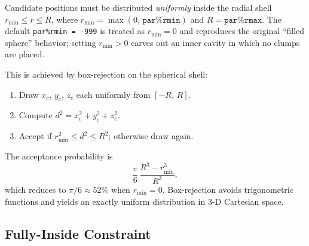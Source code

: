 \documentclass[english,a4paper]{my_memo}
\begin{document}
Candidate positions must be distributed \emph{uniformly} inside the radial
shell $r_\mathrm{min} \le r \le R$, where $r_\mathrm{min} = \max(0,\,
\texttt{par\%rmin})$ and $R = \texttt{par\%rmax}$.  The default
\verb|par%rmin = -999| is treated as $r_\mathrm{min} = 0$ and reproduces
the original ``filled sphere'' behavior; setting $r_\mathrm{min} > 0$
carves out an inner cavity in which no clumps are placed.

This is achieved by box-rejection on the spherical shell:
\begin{enumerate}
  \item Draw $x_c$, $y_c$, $z_c$ each uniformly from $[-R,\, R]$.
  \item Compute $d^2 = x_c^2 + y_c^2 + z_c^2$.
  \item Accept if $r_\mathrm{min}^2 \le d^2 \le R^2$; otherwise draw again.
\end{enumerate}
The acceptance probability is
\begin{equation}
   \frac{\pi}{6}\,\frac{R^3 - r_\mathrm{min}^3}{R^3},
\end{equation}
which reduces to $\pi/6 \approx 52\%$ when $r_\mathrm{min} = 0$.  Box-rejection
avoids trigonometric functions and yields an exactly uniform distribution
in 3-D Cartesian space.

\subsection{Fully-Inside Constraint}
\label{sec:fully_inside}
\end{document}
